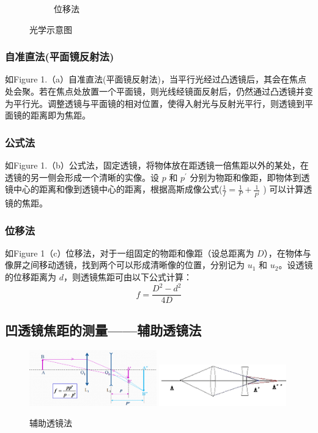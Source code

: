 \documentclass[12pt,a4paper]{article}
\begin{document}
\begin{figure}[H]
\begin{subfigure}{0.32\textwidth}
					\caption{位移法}
				\end{subfigure}
				\caption{光学示意图}
				\label{fig:formula_method}
			\end{figure}
			
			\subsubsection{自准直法(平面镜反射法)}
				如Figure 1.（a）自准直法(平面镜反射法)，当平行光经过凸透镜后，其会在焦点处会聚。若在焦点处放置一个平面镜，则光线经镜面反射后，仍然通过凸透镜并变为平行光。调整透镜与平面镜的相对位置，使得入射光与反射光平行，则透镜到平面镜的距离即为焦距。
			\subsubsection{公式法}
				如Figure 1.（b）公式法，固定透镜，将物体放在距透镜一倍焦距以外的某处，在透镜的另一侧会形成一个清晰的实像。设 $p$ 和 $p^{\prime}$ 分别为物距和像距，即物体到透镜中心的距离和像到透镜中心的距离，根据高斯成像公式(\quad $\frac{1}{f} = \frac{1}{P} + \frac{1}{P^{\prime}}$ \quad) 可以计算透镜的焦距。
			\subsubsection{位移法}
				如Figure 1（c）位移法，对于一组固定的物距和像距（设总距离为 $D$），在物体与像屏之间移动透镜，找到两个可以形成清晰像的位置，分别记为 $u_1$ 和 $u_2$。设透镜的位移距离为 $d$，则透镜焦距可由以下公式计算：
				\begin{equation}
			 	f = \frac{D^2 - d^2}{4D}
				\end{equation}

		\subsection{凹透镜焦距的测量——辅助透镜法}
			\begin{figure}[htbp]
			\centering
			\includegraphics[width=0.49\textwidth]{辅助透镜法1.png}
			\includegraphics[width=0.49\textwidth]{辅助透镜法2.png}
			\caption{辅助透镜法}
			\label{fig:chart1}
		\end{figure}
	
\end{document}
